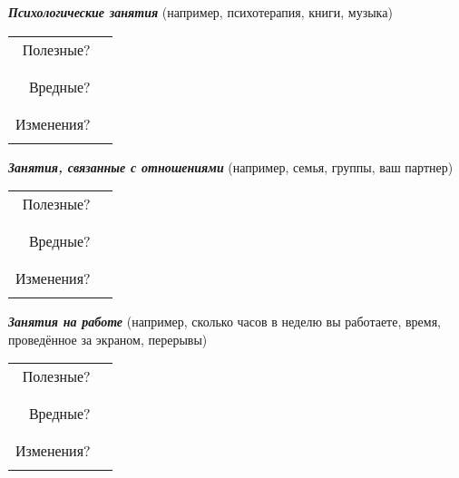 \vspace{5ex}

\noindent\textbf{\emph{Психологические занятия}} (например, психотерапия, книги, музыка)

\vspace{2ex}

\noindent
\setlength{\extrarowheight}{2mm}
\begin{tabular*}{\textwidth}{rp{11.7cm}}
	Полезные? & \\ \cline{2-2}
	& \\ \cline{2-2}
	\\
	Вредные? & \\ \cline{2-2}
	& \\ \cline{2-2}
	\\
	Изменения? & \\ \cline{2-2}
	& \\ \cline{2-2}
\end{tabular*}
\setlength{\extrarowheight}{0mm}

\newpage
\noindent\textbf{\emph{Занятия, связанные с отношениями}} (например, семья, группы, ваш партнер)

\vspace{2ex}

\noindent
\setlength{\extrarowheight}{2mm}
\begin{tabular*}{\textwidth}{rp{11.7cm}}
	Полезные? & \\ \cline{2-2}
	& \\ \cline{2-2}
	\\
	Вредные? & \\ \cline{2-2}
	& \\ \cline{2-2}
	\\
	Изменения? & \\ \cline{2-2}
	& \\ \cline{2-2}
\end{tabular*}
\setlength{\extrarowheight}{0mm}

\vspace{5ex}

\noindent\textbf{\emph{Занятия на работе }} (например, сколько часов в неделю вы работаете, время, проведённое за экраном, перерывы)

\vspace{2ex}

\noindent
\setlength{\extrarowheight}{2mm}
\begin{tabular*}{\textwidth}{rp{11.7cm}}
	Полезные? & \\ \cline{2-2}
	& \\ \cline{2-2}
	\\
	Вредные? & \\ \cline{2-2}
	& \\ \cline{2-2}
	\\
	Изменения? & \\ \cline{2-2}
	& \\ \cline{2-2}
\end{tabular*}
\setlength{\extrarowheight}{0mm}


